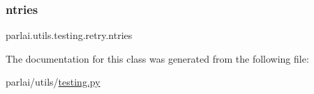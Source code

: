 \subsubsection{\texorpdfstring{ntries}{ntries}}
{\footnotesize\ttfamily parlai.\+utils.\+testing.\+retry.\+ntries}



The documentation for this class was generated from the following file\+:\begin{DoxyCompactItemize}
\item 
parlai/utils/\hyperlink{testing_8py}{testing.\+py}\end{DoxyCompactItemize}
